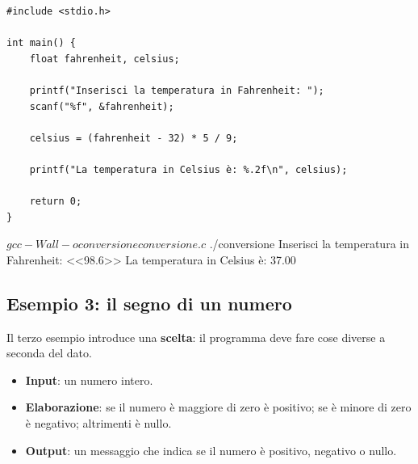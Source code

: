 \begin{affianco}[0.55]
\begin{lstlisting}[style=c, name=conversione.c]
#include <stdio.h>

int main() {
    float fahrenheit, celsius;

    printf("Inserisci la temperatura in Fahrenheit: ");
    scanf("%f", &fahrenheit);

    celsius = (fahrenheit - 32) * 5 / 9;

    printf("La temperatura in Celsius è: %.2f\n", celsius);

    return 0;
}
\end{lstlisting}
\risultato
\begin{console}
$ gcc -Wall -o conversione conversione.c
$ ./conversione
Inserisci la temperatura in Fahrenheit: <<98.6>>
La temperatura in Celsius è: 37.00
\end{console}
\end{affianco}


\subsection{Esempio 3: il segno di un numero}

Il terzo esempio introduce una \textbf{scelta}: il programma deve fare cose
diverse a seconda del dato.

\begin{itemize}
  \item \textbf{Input}: un numero intero.
  \item \textbf{Elaborazione}: se il numero è maggiore di zero è positivo;
        se è minore di zero è negativo; altrimenti è nullo.
  \item \textbf{Output}: un messaggio che indica se il numero è positivo,
        negativo o nullo.
\end{itemize}

